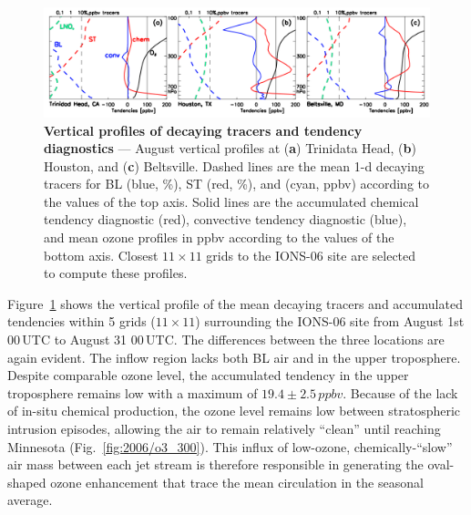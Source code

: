	\begin{figure}[t!]
		\centering
		 \label{fig:2006/tendency_vertical} 
		\includegraphics[width=1.0\textwidth]{tendency/vertical.png}
		\caption[Vertical profiles of decaying tracers and tendency diagnostics]{\textbf{Vertical profiles of decaying tracers
		and tendency diagnostics} --- August vertical profiles at ({\bf a}) Trinidata Head, ({\bf b}) Houston,
		and ({\bf c}) Beltsville. Dashed lines are the mean 1-d decaying tracers for BL (blue, \unit{\%}), ST (red, \unit{\%}), and {\lnox} (cyan,
		\unit{ppbv}) according to the values of the top axis. Solid lines are the accumulated chemical tendency diagnostic (red), convective
		tendency diagnostic (blue), and mean ozone profiles in \unit{ppbv} according to the values of the bottom axis. Closest $11\times11$
		grids to the IONS-06 site are selected to compute these profiles.}\vspace{-.3in}
	\end{figure}

Figure~\ref{fig:2006/tendency_vertical} shows the vertical profile of the mean decaying tracers and accumulated
tendencies within 5 grids ($11\times11$) surrounding the
IONS-06 site from August 1st 00\,\unit{UTC} to August 31 00\,\unit{UTC}. The differences between the three locations are again evident. The inflow
region lacks both BL air and {\lnox} in the upper troposphere. Despite comparable ozone level, the accumulated tendency in the upper
troposphere remains low with a maximum of $19.4\pm2.5\,\unit{ppbv}$. Because of the lack of in-situ chemical production, the ozone level remains
low between stratospheric intrusion episodes, allowing the air to remain relatively ``clean'' until reaching Minnesota (Fig.~\ref{fig:2006/o3_300}).
This influx of low-ozone, chemically-``slow'' air mass between each jet stream is therefore responsible in generating the oval-shaped
ozone enhancement that trace the mean circulation in the seasonal average.

